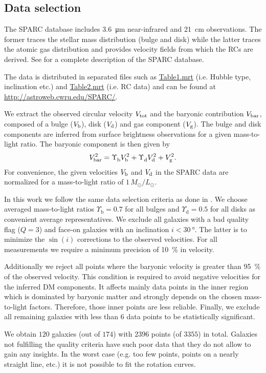 \subsection{Data selection}
\label{sec:data}

The SPARC database includes \SI{3.6}{\micro\meter} near-infrared and \SI{21}{\centi\meter} observations. The former traces the stellar mass distribution (bulge and disk) while the latter traces the atomic gas distribution and provides velocity fields from which the RCs are derived. See \citet{2016AJ....152..157L} for a complete description of the SPARC database.

The data is distributed in separated files such as \href{http://astroweb.cwru.edu/SPARC/SPARC_Lelli2016c.mrt}{Table1.mrt} (i.e. Hubble type, inclination etc.) and \href{http://astroweb.cwru.edu/SPARC/MassModels_Lelli2016c.mrt}{Table2.mrt} (i.e. RC data) and can be found at \url{http://astroweb.cwru.edu/SPARC/}.

We extract the observed circular velocity $V_\mathrm{tot}$ and the baryonic contribution $V_\mathrm{bar}$, composed of a bulge ($V_\mathrm{b}$), disk ($V_\mathrm{d}$) and gas component ($V_\mathrm{g}$). The bulge and disk components are inferred from surface brightness observations for a given mass-to-light ratio. The baryonic component is then given by 
%
\begin{equation}
	\label{eqn:baryonic-sum}
	\SYMvbar^2 = \Upsilon_\mathrm{b}^{\phantom{2}} \SYMvbulge^2 + \Upsilon_\mathrm{d}^{\phantom{2}} \SYMvdisk^2 + \SYMvgas^2.
\end{equation} 
%
For convenience, the given velocities $V_\mathrm{b}$ and $V_\mathrm{d}$ in the SPARC data are normalized for a mass-to-light ratio of $1\,M_\odot/L_\odot$.

In this work we follow the same data selection criteria as done in \citet{2016PhRvL.117t1101M}. We choose averaged mass-to-light ratios $\Upsilon_\mathrm{b} = 0.7$ for all bulges and $\Upsilon_\mathrm{d} = 0.5$ for all disks as convenient average representatives. We exclude all galaxies with a bad quality flag ($Q=3$) and face-on galaxies with an inclination $i < \SI{30}{\degree}$. The latter is to minimize the $\sin(i)$ corrections to the observed velocities. For all measurements we require a minimum precision of \SI{10}{\percent} in velocity.

Additionally we reject all points where the baryonic velocity is greater than \SI{95}{\percent} of the observed velocity. This condition is required to avoid negative velocities for the inferred DM components. It affects mainly data points in the inner region which is dominated by baryonic matter and strongly depends on the chosen mass-to-light factors. Therefore, those inner points are less reliable. Finally, we exclude all remaining galaxies with less than 6 data points to be statistically significant.

We obtain $120$ galaxies (out of $174$) with $2396$ points (of $3355$) in total. Galaxies not fulfilling the quality criteria have such poor data that they do not allow to gain any insights. In the worst case (e.g. too few points, points on a nearly straight line, etc.) it is not possible to fit the rotation curves.

